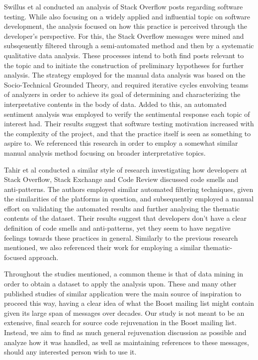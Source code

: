 Swillus et al\cite{swillus2023sentiment} conducted an analysis of Stack Overflow posts regarding software testing. While also focusing on a widely applied and influential topic on software development, the analysis focused on how this practice is perceived through the developer's perspective. For this, the Stack Overflow messages were mined and subsqeuently filtered through a semi-automated method and then by a systematic qualitative data analysis. These processes intend to both find posts relevant to the topic and to initiate the construction of preliminary hypotheses for further analysis. The strategy employed for the manual data analysis was based on the Socio-Technical Grounded Theory\cite{hoda2021socio}, and required iterative cycles envolving teams of analyzers in order to achieve its goal of determining and characterizing the interpretative contents in the body of data. Added to this, an automated sentiment analysis was employed to verify the sentimental response each topic of interest had. Their results suggest that software testing motivation increased with the complexity of the project, and that the practice itself is seen as something to aspire to. We referenced this research in order to employ a somewhat similar manual analysis method focusing on broader interpretative topics.

Tahir et al\cite{tahir2020large} conducted a similar style of research investigating how developers at Stack Overflow, Stack Exchange and Code Review discussed code smells and anti-patterns. The authors employed similar automated filtering techniques, given the similarities of the platforms in question, and subsequently employed a manual effort on validating the automated results and further analysing the thematic contents of the dataset. Their results suggest that developers don't have a clear definition of code smells and anti-patterns, yet they seem to have negative feelings towards these practices in general. Similarly to the previous research mentioned, we also referenced their work for employing a similar thematic-focused approach.

Throughout the studies mentioned, a common theme is that of data mining in order to obtain a dataset to apply the analysis upon. These and many other published studies of similar application were the main source of inspiration to proceed this way, having a clear idea of what the Boost mailing list might contain given its large span of messages over decades. Our study is not meant to be an extensive, final search for source code rejuvenation in the Boost mailing list. Instead, we aim to find as much general rejuvenation discussion as possible and analyze how it was handled, as well as maintaining references to these messages, should any interested person wish to use it.


